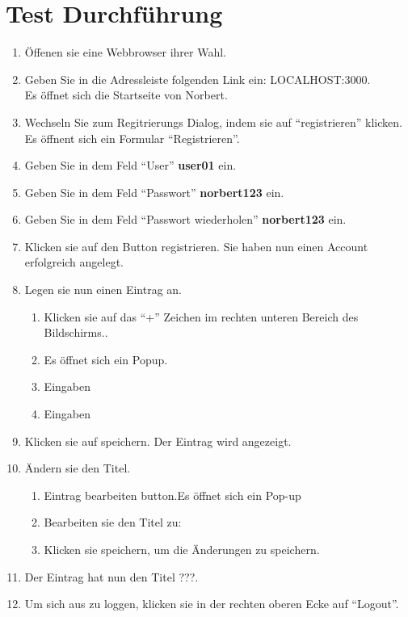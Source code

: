 \section{Test Durchführung}
\begin{enumerate}
\item Öffenen sie eine Webbrowser ihrer Wahl.
\item Geben Sie in die Adressleiste folgenden Link ein: LOCALHOST:3000. \\Es öffnet sich die Startseite von Norbert.
\item Wechseln Sie zum Regitrierungs Dialog, indem sie auf \enquote{registrieren} klicken. Es öffnent sich ein Formular \enquote{Registrieren}.
\item Geben Sie in dem Feld \enquote{User} \textbf{user01} ein.
\item Geben Sie in dem Feld \enquote{Passwort} \textbf{norbert123} ein.
\item Geben Sie in dem Feld \enquote{Passwort wiederholen} \textbf{norbert123} ein.
\item Klicken sie auf den Button registrieren. Sie haben nun einen Account erfolgreich angelegt.
\item Legen sie nun einen Eintrag an.
\begin{enumerate}
\item Klicken sie auf das \enquote{+} Zeichen im rechten unteren Bereich des Bildschirms..
\item Es öffnet sich ein Popup.
\item Eingaben
\item Eingaben
\end{enumerate}
\item Klicken sie auf speichern. Der Eintrag wird angezeigt.
\item Ändern sie den Titel.
\begin{enumerate}
\item Eintrag bearbeiten button.Es öffnet sich ein Pop-up
\item Bearbeiten sie den Titel zu: 
\item Klicken sie speichern, um die Änderungen zu speichern.
\end{enumerate}
\item Der Eintrag hat nun den Titel ???.
\item Um sich aus zu loggen, klicken sie in der rechten oberen Ecke auf \enquote{Logout}.
\end{enumerate}

